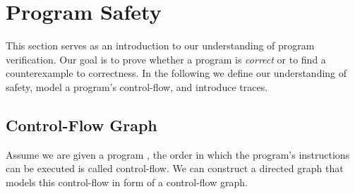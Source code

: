 \section{Program Safety}
This section serves as an introduction to our understanding of program verification. Our goal is to prove whether a program is \textsl{correct} or to find a counterexample to correctness. In the following we define our understanding of safety, model a program's control-flow, and introduce traces.
\subsection{Control-Flow Graph}
 Assume we are given a program \prg, the order in which the program's instructions can be executed is called control-flow. We can construct a directed graph that models this control-flow in form of a control-flow graph.
 
